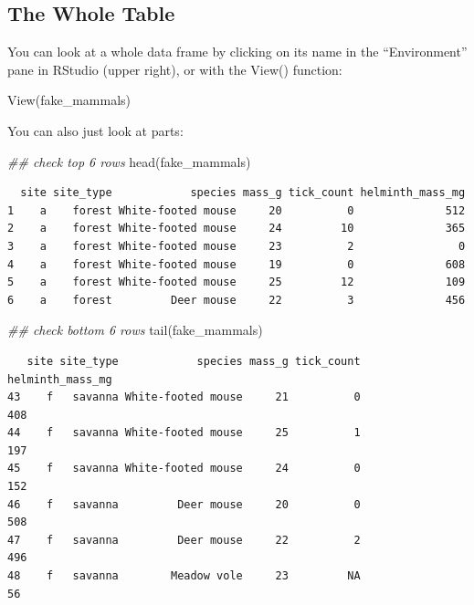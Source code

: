 \documentclass[
  letterpaper,
  DIV=11,
  numbers=noendperiod]{scrreprt}
\newenvironment{Shaded}{\begin{snugshade}}{\end{snugshade}}
\newcommand{\DocumentationTok}[1]{\textcolor[rgb]{0.37,0.37,0.37}{\textit{#1}}}
\newcommand{\FunctionTok}[1]{\textcolor[rgb]{0.28,0.35,0.67}{#1}}
\newcommand{\NormalTok}[1]{\textcolor[rgb]{0.00,0.23,0.31}{#1}}
\begin{document}
\subsection{The Whole Table}\label{the-whole-table}

You can look at a whole data frame by clicking on its name in the
``Environment'' pane in RStudio (upper right), or with the View()
function:

\begin{Shaded}
\begin{Highlighting}[]
\FunctionTok{View}\NormalTok{(fake\_mammals)}
\end{Highlighting}
\end{Shaded}

You can also just look at parts:

\begin{Shaded}
\begin{Highlighting}[]
\DocumentationTok{\#\# check top 6 rows}
\FunctionTok{head}\NormalTok{(fake\_mammals)}
\end{Highlighting}
\end{Shaded}

\begin{verbatim}
  site site_type            species mass_g tick_count helminth_mass_mg
1    a    forest White-footed mouse     20          0              512
2    a    forest White-footed mouse     24         10              365
3    a    forest White-footed mouse     23          2                0
4    a    forest White-footed mouse     19          0              608
5    a    forest White-footed mouse     25         12              109
6    a    forest         Deer mouse     22          3              456
\end{verbatim}

\begin{Shaded}
\begin{Highlighting}[]
\DocumentationTok{\#\# check bottom 6 rows}
\FunctionTok{tail}\NormalTok{(fake\_mammals)}
\end{Highlighting}
\end{Shaded}

\begin{verbatim}
   site site_type            species mass_g tick_count helminth_mass_mg
43    f   savanna White-footed mouse     21          0              408
44    f   savanna White-footed mouse     25          1              197
45    f   savanna White-footed mouse     24          0              152
46    f   savanna         Deer mouse     20          0              508
47    f   savanna         Deer mouse     22          2              496
48    f   savanna        Meadow vole     23         NA               56
\end{verbatim}
\end{document}
